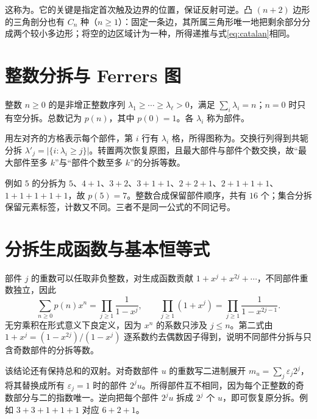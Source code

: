 \documentclass[UTF8,12pt,a4paper,fontset=fandol]{ctexbook}
\begin{document}
这称为。它的关键是指定首次触及边界的位置，保证反射可逆。凸 $(n+2)$ 边形的三角剖分也有 $C_n$ 种（$n\ge1$）：固定一条边，其所属三角形唯一地把剩余部分分成两个较小多边形；将空的边区域计为一种，所得递推与式\eqref{eq:catalan}相同。

\section{整数分拆与 Ferrers 图}

\begin{definition}
整数 $n\ge0$ 的是非增正整数序列 $\lambda_1\ge\cdots\ge\lambda_\ell>0$，满足 $\sum_i\lambda_i=n$；$n=0$ 时只有空分拆。总数记为 $p(n)$，其中 $p(0)=1$。各 $\lambda_i$ 称为部件。
\end{definition}

用左对齐的方格表示每个部件，第 $i$ 行有 $\lambda_i$ 格，所得图称为。交换行列得到共轭分拆 $\lambda'_j=|\{i:\lambda_i\ge j\}|$。转置两次恢复原图，且最大部件与部件个数交换，故“最大部件至多 $k$”与“部件个数至多 $k$”的分拆等数。

例如 $5$ 的分拆为 $5$、$4+1$、$3+2$、$3+1+1$、$2+2+1$、$2+1+1+1$、$1+1+1+1+1$，故 $p(5)=7$。整数合成保留部件顺序，共有 $16$ 个；集合分拆保留元素标签，计数又不同。三者不是同一公式的不同记号。

\section{分拆生成函数与基本恒等式}

部件 $j$ 的重数可以任取非负整数，对生成函数贡献 $1+x^j+x^{2j}+\cdots$，不同部件重数独立，因此
\begin{equation}
 \sum_{n\ge0}p(n)x^n=\prod_{j\ge1}\frac1{1-x^j},\qquad
 \prod_{j\ge1}(1+x^j)=\prod_{j\ge1}\frac1{1-x^{2j-1}}.
 \label{eq:partition-products}
\end{equation}
无穷乘积在形式意义下良定义，因为 $x^n$ 的系数只涉及 $j\le n$。第二式由 $1+x^j=(1-x^{2j})/(1-x^j)$ 逐系数约去偶数因子得到，说明不同部件分拆与只含奇数部件的分拆等数。

该结论还有保持总和的双射。对奇数部件 $u$ 的重数写二进制展开 $m_u=\sum_j\varepsilon_j2^j$，将其替换成所有 $\varepsilon_j=1$ 时的部件 $2^ju$。所得部件互不相同，因为每个正整数的奇数部分与二的指数唯一。逆向把每个部件 $2^ju$ 拆成 $2^j$ 个 $u$，即可恢复原分拆。例如 $3+3+1+1+1$ 对应 $6+2+1$。
\end{document}
